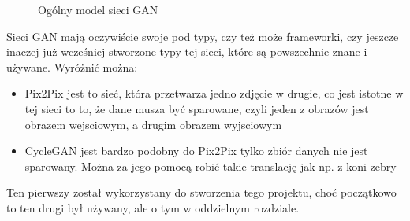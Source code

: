 \documentclass[12pt]{article}
\begin{document}
\begin{sloppypar}
{{\begin{figure}[H]
      \caption{Ogólny model sieci GAN \cite{google-gan}}
      \label{fig:gan-budowa}
    \end{figure}
    Sieci GAN mają oczywiście swoje pod typy, czy też może frameworki, czy jeszcze inaczej już wcześniej stworzone typy tej sieci, które są powszechnie znane i używane.
    Wyróżnić można:
    \begin{itemize}
      \item Pix2Pix jest to sieć, która przetwarza jedno zdjęcie w drugie, co jest istotne w tej sieci to to, że dane musza być sparowane, czyli jeden z obrazów jest obrazem wejsciowym, a drugim obrazem wyjsciowym
      \item CycleGAN jest bardzo podobny do Pix2Pix tylko zbiór danych nie jest sparowany. Można za jego pomocą robić takie translację jak np. z koni zebry
    \end{itemize}
    Ten pierwszy został wykorzystany do stworzenia tego projektu, choć początkowo to ten drugi był używany, ale o tym w oddzielnym rozdziale.
  }
}
\end{sloppypar}
\end{document}
